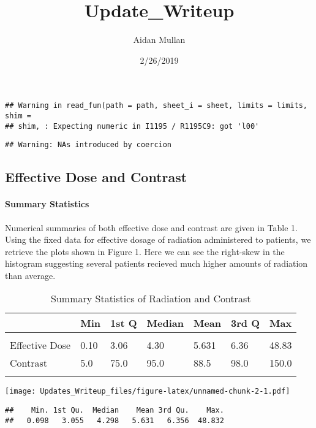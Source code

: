 \documentclass[]{article}
\title{Update\_Writeup}
\author{Aidan Mullan}
\date{2/26/2019}
\let\oldparagraph\paragraph
\renewcommand{\paragraph}[1]{\oldparagraph{#1}\mbox{}}
\begin{document}
\maketitle

\begin{verbatim}
## Warning in read_fun(path = path, sheet_i = sheet, limits = limits, shim =
## shim, : Expecting numeric in I1195 / R1195C9: got 'l00'
\end{verbatim}

\begin{verbatim}
## Warning: NAs introduced by coercion
\end{verbatim}

\subsection{Effective Dose and
Contrast}\label{effective-dose-and-contrast}

\paragraph{Summary Statistics}\label{summary-statistics}

Numerical summaries of both effective dose and contrast are given in
Table 1. Using the fixed data for effective dosage of radiation
administered to patients, we retrieve the plots shown in Figure 1. Here
we can see the right-skew in the histogram suggesting several patients
recieved much higher amounts of radiation than average.

\begin{table}[H] \centering 
  \caption{Summary Statistics of Radiation and Contrast} 
\begin{tabular}{p{3cm}p{1cm}p{1cm}p{1cm}p{1cm}p{1cm}p{1cm}}
\\[-1.8ex] \hline 
\hline
 & Min & 1st Q & Median & Mean & 3rd Q & Max \\ 
\hline \\[-1.8ex] 
Effective Dose & 0.10 & 3.06 & 4.30 & 5.631 & 6.36 & 48.83 \\
Contrast       & 5.0 & 75.0 & 95.0 & 88.5 & 98.0 & 150.0 \\
\hline 
\hline \\[-1.8ex]
 \end{tabular}
\end{table}

\texttt{[image: Updates\_Writeup\_files/figure-latex/unnamed-chunk-2-1.pdf]}

\begin{verbatim}
##    Min. 1st Qu.  Median    Mean 3rd Qu.    Max. 
##   0.098   3.055   4.298   5.631   6.356  48.832
\end{verbatim}
\end{document}
